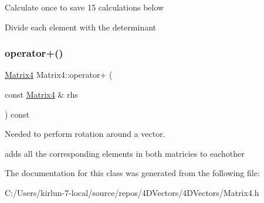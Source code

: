 Calculate once to save 15 calculations below

Divide each element with the determinant \mbox{\label{class_matrix4_a61b8f5a2f89ae56c43b91e750ae6e580}} 
\subsubsection{\texorpdfstring{operator+()}{operator+()}}
{\footnotesize\ttfamily \mbox{\hyperlink{class_matrix4}{Matrix4}} Matrix4\+::operator+ (\begin{DoxyParamCaption}\item[{const \mbox{\hyperlink{class_matrix4}{Matrix4}} \&}]{rhs }\end{DoxyParamCaption}) const}



Needed to perform rotation around a vector. 

adds all the corresponding elements in both matricies to eachother 

The documentation for this class was generated from the following file\+:\begin{DoxyCompactItemize}
\item 
C\+:/\+Users/kirlun-\/7-\/local/source/repos/4\+D\+Vectors/4\+D\+Vectors/Matrix4.\+h\end{DoxyCompactItemize}
